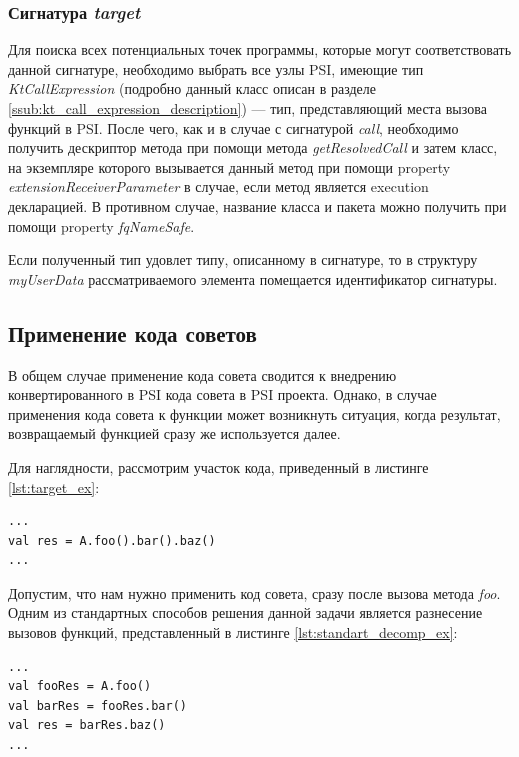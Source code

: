 \subsubsection{Сигнатура \textit{target}}
\label{ssub:target_signature}
Для поиска всех потенциальных точек программы, которые могут соответствовать
данной сигнатуре, необходимо выбрать все узлы PSI, имеющие тип
\textit{KtCallExpression} (подробно данный класс описан в разделе
\ref{ssub:kt_call_expression_description}) --- тип, представляющий места вызова
функций в PSI.
После чего, как и в случае с сигнатурой \textit{call}, необходимо получить
дескриптор метода при помощи метода \textit{getResolvedCall} и затем класс, на
экземпляре которого вызывается данный метод при помощи property
\textit{extensionReceiverParameter} в случае, если метод является execution
декларацией.
В противном случае, название класса и пакета можно получить при помощи property
\textit{fqNameSafe}.

Если полученный тип удовлет	типу, описанному в сигнатуре, то в структуру
\textit{myUserData} рассматриваемого элемента помещается идентификатор
сигнатуры.
\subsection{Применение кода советов}
\label{ssec:advice_applying_description}
В общем случае применение кода совета сводится к внедрению конвертированного в
PSI кода совета в PSI проекта.
Однако, в случае применения кода совета к функции может возникнуть ситуация,
когда результат, возвращаемый функцией сразу же используется далее.

Для наглядности, рассмотрим участок кода, приведенный в листинге
\ref{lst:target_ex}:
\begin{lstlisting}[label=lst:target_ex,
    caption={Пример целевой точки внедрения}]
...
val res = A.foo().bar().baz()
...
\end{lstlisting}
Допустим, что нам нужно применить код совета, сразу после вызова метода
\textit{foo}.
Одним из стандартных способов решения данной задачи является разнесение вызовов
функций, представленный в листинге \ref{lst:standart_decomp_ex}:
\begin{lstlisting}[label=lst:standart_decomp_ex,
    caption={Пример разнесения вызовов методов}]
...
val fooRes = A.foo()
val barRes = fooRes.bar()
val res = barRes.baz()
...
\end{lstlisting}

